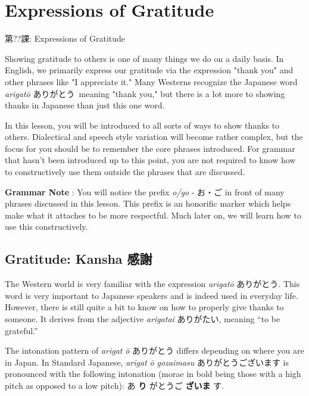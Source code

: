     
\chapter*{Expressions of Gratitude}

\begin{center}
\begin{Large}
第??課: Expressions of Gratitude 
\end{Large}
\end{center}
 
\par{ Showing gratitude to others is one of many things we do on a daily basis. In English, we primarily express our gratitude via the expression "thank you" and other phrases like "I appreciate it." Many Westerns recognize the Japanese word \emph{arigatō }ありがとう meaning "thank you," but there is a lot more to showing thanks in Japanese than just this one word. }

\par{ In this lesson, you will be introduced to all sorts of ways to show thanks to others. Dialectical and speech style variation will become rather complex, but the focus for you should be to remember the core phrases introduced. For grammar that hasn't been introduced up to this point, you are not required to know how to constructively use them outside the phrases that are discussed. }

\par{\textbf{Grammar Note }: You will notice the prefix \emph{o\slash go }- お・ご in front of many phrases discussed in this lesson. This prefix is an honorific marker which helps make what it attaches to be more respectful. Much later on, we will learn how to use this constructively. }
      
\section{Gratitude: Kansha 感謝}
 
\par{ The Western world is very familiar with the expression \emph{arigatō }ありがとう. This word is very important to Japanese speakers and is indeed used in everyday life. However, there is still quite a bit to know on how to properly give thanks to someone. It derives from the adjective \emph{arigatai }ありがたい, meaning “to be grateful.” }

\par{ The intonation pattern of \emph{arigat }\emph{ō }ありがとう differs depending on where you are in Japan. In Standard Japanese, \emph{arigat }\emph{ō gozaimasu }ありがとうございます is pronounced with the following intonation (morae in bold being those with a high pitch as opposed to a low pitch): あ \textbf{り }がとうご \textbf{ざいま }す. }

